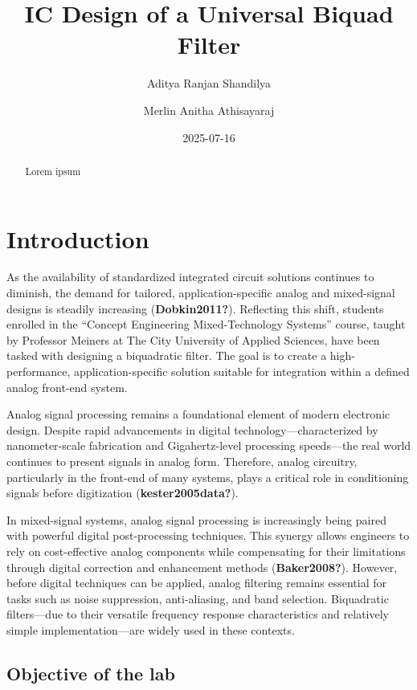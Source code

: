 \documentclass[
  letterpaper,
  DIV=11,
  numbers=noendperiod]{scrreprt}
\title{IC Design of a Universal Biquad Filter}
\author{Aditya Ranjan Shandilya \and Merlin Anitha Athisayaraj}
\date{2025-07-16}
\renewcommand*\contentsname{Table of contents}
\newcommand\contentsname{Table of contents}
\begin{document}
\maketitle
\begin{abstract}
Lorem ipsum
\end{abstract}

\renewcommand*\contentsname{Table of contents}
{
\hypersetup{linkcolor=}
\setcounter{tocdepth}{2}
\tableofcontents
}

\chapter{Introduction}\label{introduction}

As the availability of standardized integrated circuit solutions
continues to diminish, the demand for tailored, application-specific
analog and mixed-signal designs is steadily increasing
(\textbf{Dobkin2011?}). Reflecting this shift, students enrolled in the
``Concept Engineering Mixed-Technology Systems'' course, taught by
Professor Meiners at The City University of Applied Sciences, have been
tasked with designing a biquadratic filter. The goal is to create a
high-performance, application-specific solution suitable for integration
within a defined analog front-end system.

Analog signal processing remains a foundational element of modern
electronic design. Despite rapid advancements in digital
technology---characterized by nanometer-scale fabrication and
Gigahertz-level processing speeds---the real world continues to present
signals in analog form. Therefore, analog circuitry, particularly in the
front-end of many systems, plays a critical role in conditioning signals
before digitization (\textbf{kester2005data?}).

In mixed-signal systems, analog signal processing is increasingly being
paired with powerful digital post-processing techniques. This synergy
allows engineers to rely on cost-effective analog components while
compensating for their limitations through digital correction and
enhancement methods (\textbf{Baker2008?}). However, before digital
techniques can be applied, analog filtering remains essential for tasks
such as noise suppression, anti-aliasing, and band selection.
Biquadratic filters---due to their versatile frequency response
characteristics and relatively simple implementation---are widely used
in these contexts.

\section{Objective of the lab}\label{objective-of-the-lab}
\end{document}

